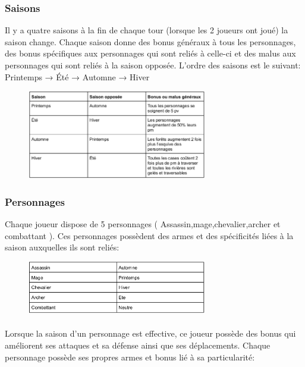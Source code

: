 \documentclass[a4paper,12pt]{article}
\begin{document}
\subsubsection{Saisons}
Il y a quatre saisons à la fin de chaque tour (lorsque les 2 joueurs ont joué) la saison change. Chaque saison donne des bonus généraux à tous les personnages, des bonus spécifiques aux personnages qui sont reliés à celle-ci et des malus aux personnages qui sont reliés à la saison opposée. L’ordre des saisons est le suivant: Printemps → Été → Automne → Hiver
\begin{figure}[ht]
\begin{center}
\includegraphics[width=0.7\textwidth]{tableausaison.png}
\end{center}
\end{figure}
\subsubsection{Personnages}
Chaque joueur dispose de 5 personnages ( Assassin,mage,chevalier,archer et combattant ). Ces personnages possèdent des armes et des spécificités liées à la saison auxquelles ils sont reliés:
\begin{figure}[ht]
\begin{center}
\includegraphics[width=0.7\textwidth]{tableaupersonnages.png}
\end{center}
\end{figure}
\paragraph{}
Lorsque la saison d’un personnage est effective, ce joueur possède des bonus  qui améliorent ses attaques et sa défense ainsi que ses déplacements.
Chaque personnage possède ses propres armes et bonus lié à sa particularité: 
\end{document}
